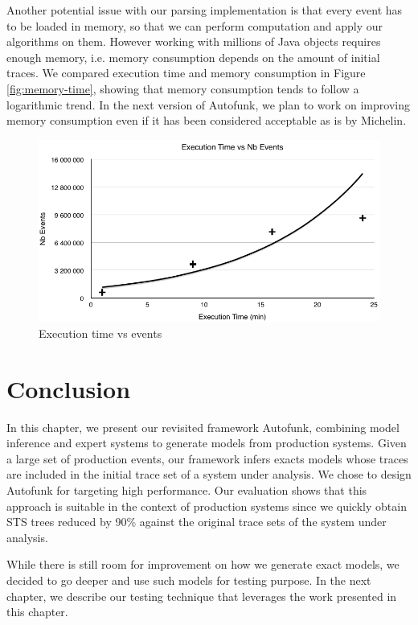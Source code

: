 Another potential issue with our parsing implementation is that
every event has to be loaded in memory, so that we can perform
computation and apply our algorithms on them. However working
with millions of Java objects requires enough memory, i.e.
memory consumption depends on the amount of initial traces. We
compared execution time and memory consumption in Figure
\ref{fig:memory-time}, showing that memory consumption tends to
follow a logarithmic trend. In the next version of Autofunk, we
plan to work on improving memory consumption even if it has been
considered acceptable as is by Michelin.

\begin{figure}[ht]
  \includegraphics[width=0.9\linewidth]{figures/time-vs-messages.png}

  \caption{Execution time vs events}
  \label{fig:time-vs-messages}
\end{figure}


\section{Conclusion}
\label{sec:modelinf:prodsystems:conclusion}

In this chapter, we present our revisited framework Autofunk,
combining model inference and expert systems to generate models
from production systems. Given a large set of production events,
our framework infers exacts models whose traces are included in
the initial trace set of a system under analysis. We chose to
design Autofunk for targeting high performance. Our evaluation
shows that this approach is suitable in the context of production
systems since we quickly obtain STS trees reduced by 90\% against
the original trace sets of the system under analysis.

While there is still room for improvement on how we generate
exact models, we decided to go deeper and use such models for
testing purpose. In the next chapter, we describe our testing
technique that leverages the work presented in this chapter.


